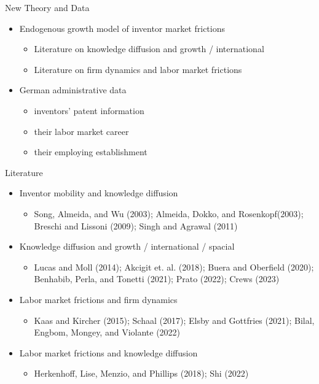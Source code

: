 \documentclass{beamer}
\begin{document}
\begin{frame}{New Theory and Data}
  \begin{itemize}
    \setlength\itemsep{3mm}
    \item Endogenous growth model of inventor market frictions
          \begin{itemize}
            \item Literature on knowledge diffusion and growth / international
            \item Literature on firm dynamics and labor market frictions
          \end{itemize}
    \item German administrative data
          \begin{itemize}
            \item inventors' patent information
            \item their labor market career
            \item their employing establishment
          \end{itemize}
  \end{itemize}
\end{frame}

\begin{frame}{Literature}
  \begin{itemize}
    \setlength\itemsep{3mm}
    \item Inventor mobility and knowledge diffusion
          \begin{itemize}
            \item \footnotesize{Song, Almeida, and Wu (2003); Almeida, Dokko, and Rosenkopf(2003); Breschi and Lissoni (2009); Singh and Agrawal (2011)}
          \end{itemize}
    \item Knowledge diffusion and growth / international / spacial
          \begin{itemize}
            \item \footnotesize{ Lucas and Moll (2014); Akcigit et. al. (2018); Buera and Oberfield (2020); Benhabib, Perla, and Tonetti (2021); Prato (2022); Crews (2023)}
          \end{itemize}
    \item Labor market frictions and firm dynamics
          \begin{itemize}
            \item \footnotesize{Kaas and Kircher (2015); Schaal (2017); Elsby and Gottfries (2021); Bilal, Engbom, Mongey, and Violante (2022)}
          \end{itemize}
    \item Labor market frictions and knowledge diffusion
          \begin{itemize}
            \item \footnotesize{Herkenhoff, Lise, Menzio, and Phillips (2018); Shi (2022)}
          \end{itemize}
  \end{itemize}
\end{frame}
\end{document}
